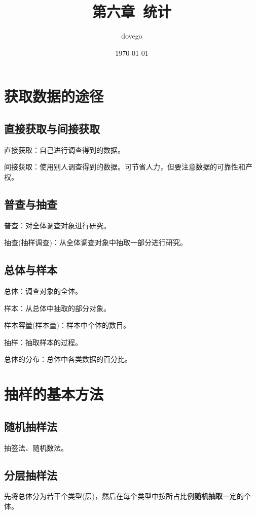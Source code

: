 \documentclass[titlepage]{ctexart}
\title{第六章~统计}
\author{dovego}
\date{\today}
\begin{document}
\maketitle

\section{获取数据的途径}

\subsection{直接获取与间接获取}

直接获取：自己进行调查得到的数据。

间接获取：使用别人调查得到的数据。可节省人力，但要注意数据的可靠性和产权。

\subsection{普查与抽查}

普查：对全体调查对象进行研究。

抽查(抽样调查)：从全体调查对象中抽取一部分进行研究。

\subsection{总体与样本}

总体：调查对象的全体。

样本：从总体中抽取的部分对象。

样本容量(样本量)：样本中个体的数目。

抽样：抽取样本的过程。

总体的分布：总体中各类数据的百分比。


\section{抽样的基本方法}

\subsection{随机抽样法}

抽签法、随机数法。

\subsection{分层抽样法}

先将总体分为若干个类型(层)，然后在每个类型中按所占比例\textbf{随机抽取}一定的个体。
\end{document}
